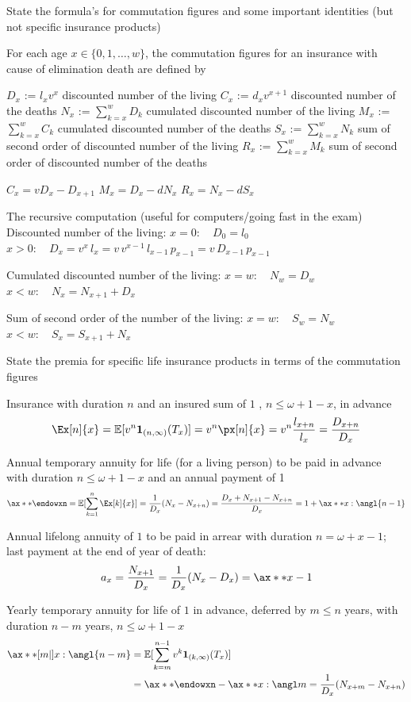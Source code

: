 \documentclass[11pt,a4paper,twoside]{article}
\begin{document}
State the formula's for commutation figures and some important identities (but not specific insurance products)


For each age \( x \in \{ 0, 1, \ldots, w \} \), the commutation figures for an insurance with cause of elimination death are defined by

\(D_x\) := \(l_x v^x\) discounted number of the living
\(C_x\) := \(d_x v^{x+1} \) discounted number of the deaths
\(N_x\) := \(\sum_{k = x}^w D_k\) cumulated discounted number of the living
\(M_x\) := \(\sum_{k = x}^w C_k\) cumulated discounted number of the deaths
\(S_x\) := \(\sum_{k = x}^w N_k\) sum of second order of discounted number of the living
\(R_x\) := \(\sum_{k = x}^w M_k\) sum of second order of discounted number of the deaths

\( C_x = vD_x - D_{x+1} \)
\( M_x = D_x - dN_x \)
\( R_x = N_x - d S_x \)

The recursive computation (useful for computers/going fast in the exam)
Discounted number of the living:
\(x = 0 : \quad D_0 = l_0\)
\(x > 0 : \quad D_x = v^x\, l_x = v\, v^{x-1}\, l_{x-1}\, p_{x-1} = v\, D_{x-1}\, p_{x-1}\)

Cumulated discounted number of the living:
\(x = w : \quad N_w = D_w\)
\(x < w : \quad N_x = N_{x+1} + D_x\)

Sum of second order of the number of the living:
\(x = w : \quad S_w = N_w \)
\(x < w : \quad S_x = S_{x+1} + N_x\)



State the premia for specific life insurance products in terms of the commutation figures

Insurance with duration \( n \) and an insured sum of \( 1 \) , \( n \leq \omega + 1 - x \), in advance \\
\[ \Ex[n]{x} = \mathbb{E}[v^{n} \mathbf{1}_{(n, \infty)}(T_x)] = v^n \px[n]{x} = v^n \frac{l_{x+n}}{l_x} = \frac{D_{x+n}}{D_x} \]

Annual temporary annuity for life (for a living person) to be paid in advance with duration
\( n \leq \omega + 1 - x \) and an annual payment of 1
\[ \ax**{\endowxn} = \mathbb{E}[\sum_{k=1}^n \Ex[k]{x}] 
= \frac{1}{D_x}(N_{x} - N_{x+n}) = \frac{D_x + N_{x+1} - N_{x+n}}{D_x} = 1 + \ax**{x:\angl{n-1}} 
\]

Annual lifelong annuity of \( 1 \) to be paid in arrear with duration \( n = \omega + x - 1 \); last
payment at the end of year of death:
\[ a_x = \frac{N_{x+1}}{D_x} = \frac{1}{D_x}(N_x - D_x) = \ax**{x} - 1\]

Yearly temporary annuity for life of \( 1 \) in advance, deferred by \( m \leq n \) years, with 
duration \( n - m \) years, \( n \leq \omega + 1 - x \) 
\begin{align*}
  \ax**[m|]{x:\angl{n - m}} &= \mathbb{E}[\sum_{k=m}^{n-1} v^k \mathbf{1}_{(k, \infty)}(T_x)]  \\
 &= \ax**{\endowxn} - \ax**{x:\angl m} = \frac{1}{D_x}(N_{x+m} - N_{x+n})
\end{align*}
\end{document}
